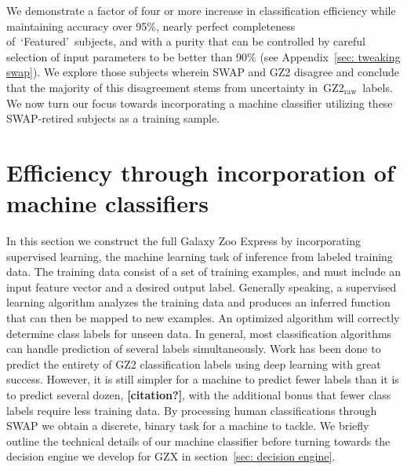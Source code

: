 \documentclass[twocolumn]{aastex6}
\newcommand{\feat}{`Featured'}
\newcommand{\raw}{GZ2$_{\text{raw}}$}
\begin{document}
We demonstrate a factor of four or more increase in 
classification efficiency while maintaining accuracy over 95\%, nearly perfect 
completeness of~\feat~subjects, and with a purity that can be controlled by careful 
selection of input parameters to be better than 90\% (see Appendix~\ref{sec: tweaking swap}).
We explore those subjects wherein SWAP and GZ2 disagree and conclude that 
the majority of this disagreement stems from uncertainty in~\raw~labels.
We now turn our focus towards incorporating a machine
classifier utilizing these SWAP-retired subjects as a training sample. 


\section{Efficiency through incorporation of machine classifiers} \label{sec: machine}

In this section we construct the full Galaxy Zoo Express by incorporating supervised 
learning, the machine learning task of inference from labeled training data. 
The training data consist of a set of training examples, and must include
an input feature vector and a desired output label.  Generally speaking,
a supervised learning algorithm analyzes the training data and produces an inferred 
function that can then be mapped to new examples. An optimized algorithm will 
correctly determine class labels for unseen data. In general, most classification 
algorithms can handle prediction of several labels simultaneously. Work has been
done to predict the entirety of GZ2 classification labels using deep learning 
\citep{Dieleman2015} with great success. 
However, it is still simpler for a machine to predict fewer labels than it is to predict several dozen, \textbf{[citation?]}, 
with the additional bonus that fewer class labels require less training data. 
By processing human classifications through SWAP we obtain a discrete, binary task
for a machine to tackle. We briefly outline the technical details of our machine
classifier before turning towards the decision engine we develop for GZX in 
section~\ref{sec: decision engine}. 
\end{document}
